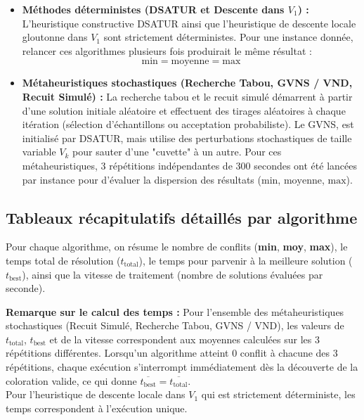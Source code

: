 \documentclass{article}
\begin{document}
\begin{itemize}
    \item \textbf{Méthodes déterministes (DSATUR et Descente dans $V_1$) :}
    L'heuristique constructive DSATUR ainsi que l'heuristique de descente locale gloutonne dans $V_1$ sont strictement déterministes. Pour une instance donnée, relancer ces algorithmes plusieurs fois produirait le même résultat :    \[
    \text{min} = \text{moyenne} = \text{max}
    \]

    \item \textbf{Métaheuristiques stochastiques (Recherche Tabou, GVNS / VND, Recuit Simulé) :}
    La recherche tabou et le recuit simulé démarrent à partir d'une solution initiale aléatoire et effectuent des tirages aléatoires à chaque itération (sélection d'échantillons ou acceptation probabiliste). Le GVNS, est initialisé par DSATUR, mais utilise des perturbations stochastiques de taille variable $V_k$ pour sauter d'une "cuvette" à un autre. Pour ces métaheuristiques, 3 répétitions indépendantes de 300 secondes ont été lancées par instance pour d'évaluer la dispersion des résultats ($\text{min}$, $\text{moyenne}$, $\text{max}$).
\end{itemize}

\subsection{Tableaux récapitulatifs détaillés par algorithme}
Pour chaque algorithme, on résume le nombre de conflits (\textbf{min}, \textbf{moy}, \textbf{max}), le temps total de résolution ($t_{\text{total}}$), le temps pour parvenir à la meilleure solution ($t_{\text{best}}$), ainsi que la vitesse de traitement (nombre de solutions évaluées par seconde).

\textbf{Remarque sur le calcul des temps :} Pour l'ensemble des métaheuristiques stochastiques (Recuit Simulé, Recherche Tabou, GVNS / VND), les valeurs de $t_{\text{total}}$, $t_{\text{best}}$ et de la vitesse correspondent aux moyennes calculées sur les 3 répétitions différentes. Lorsqu'un algorithme atteint 0 conflit à chacune des 3 répétitions, chaque exécution s'interrompt immédiatement dès la découverte de la coloration valide, ce qui donne $\overline{t_{\text{best}}} = \overline{t_{\text{total}}}$. \\
Pour l'heuristique de descente locale dans $V_1$ qui est strictement déterministe, les temps correspondent à l'exécution unique.
\end{document}
